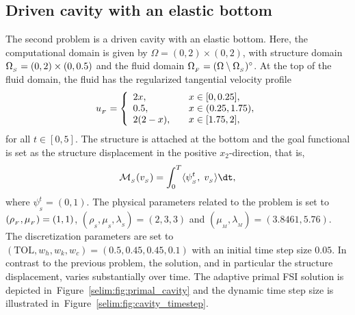\subsection{Driven cavity with an elastic bottom}

The second problem is a driven cavity with an elastic bottom. Here,
the computational domain is given by $\Omega = (0,2)\times (0,2)$,
with structure domain $\Omega_{_{S}} = (0, 2)\times (0, 0.5)$ and the fluid
domain $\Omega_{_{F}} = (\Omega\setminus \Omega_{_{S}})^{\circ}$. At the top of the fluid
domain, the fluid has the regularized tangential velocity profile
\begin{equation}
u_{_{F}} =
\left\{
\begin{array}{lcl}
2x,& &x\in[0, 0.25],\\
0.5,& &x\in(0.25 ,1.75),\\
2(2-x),&  &x\in[1.75, 2],
\end{array}
\right.
\end{equation}
for all $t \in [0,5]$. The structure is attached at the bottom and the
goal functional is set as the structure displacement in the positive
$x_2$-direction, that is,
\begin{equation}
\label{selim:eq:goalfunctional_cavity}
\M_{_{S}}(v_{_{S}}) = \int_0^T \langle \psi^t_{_{S}},\; v_{_{S}}\rangle \dt,
\end{equation}
where $\psi^t_{_{S}}=(0,1)$.  The physical parameters related to the
problem is set to $(\rho_{_{F}},\mu_{_{F}}) = (1, 1)$,
$(\rho_{_{S}},\mu_{_{S}}, \lambda_{_{S}}) = (2, 3, 3)$ and
$(\mu_{_{M}}, \lambda_{_{M}}) = (3.8461, 5.76)$. The discretization
parameters are set to $(\mathrm{TOL}, w_h, w_k,w_c) = (0.5, 0.45,
0.45, 0.1)$ with an initial time step size $0.05$.  In contrast to the
previous problem, the solution, and in particular the structure
displacement, varies substantially over time. The adaptive primal FSI
solution is depicted in~Figure~\ref{selim:fig:primal_cavity} and the
dynamic time step size is illustrated
in~Figure~\ref{selim:fig:cavity_timestep}.
